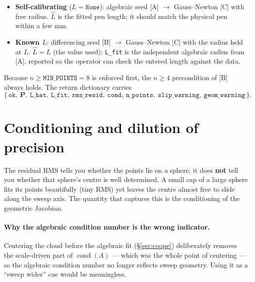 \documentclass[11pt,a4paper]{article}
\newcommand{\bP}{\mathbf{P}}
\begin{document}
\begin{itemize}
\item \textbf{Self-calibrating} ($L=\texttt{None}$): algebraic seed [A] $\to$
  Gauss--Newton [C] with free radius. $\hat L$ is the fitted pen length; it should
  match the physical pen within a few mm.
\item \textbf{Known $L$}: differencing seed [B] $\to$ Gauss--Newton [C] with the
  radius held at $L$. $\hat L = L$ (the value used); \texttt{L\_fit} is the
  independent algebraic radius from [A], reported so the operator can check the
  entered length against the data.
\end{itemize}

Because $n \ge \texttt{MIN\_POINTS} = 8$ is enforced first, the $n \ge 4$
precondition of [B] always holds. The return dictionary carries
\[
  \{\,\texttt{ok},\ \bP,\ \texttt{L\_hat},\ \texttt{L\_fit},\ \texttt{rms\_resid},\
     \texttt{cond},\ \texttt{n\_points},\ \texttt{slip\_warning},\ \texttt{geom\_warning}\,\}.
\]

\section{Conditioning and dilution of precision}
\label{sec:cond}

The residual RMS tells you whether the points lie on \emph{a} sphere; it does
\textbf{not} tell you whether that sphere's centre is well determined. A small cap
of a large sphere fits its points beautifully (tiny RMS) yet leaves the centre
almost free to slide along the sweep axis. The quantity that captures this is the
conditioning of the geometric Jacobian.

\paragraph{Why the algebraic condition number is the wrong indicator.}
Centering the cloud before the algebraic fit (\S\ref{sec:coope}) deliberately
removes the scale-driven part of $\operatorname{cond}(A)$ --- which was the whole
point of centering --- so the algebraic condition number no longer reflects sweep
geometry. Using it as a ``sweep wider'' cue would be meaningless.
\end{document}
